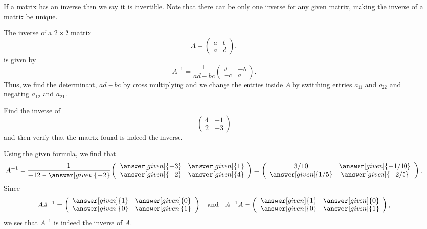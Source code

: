 \documentclass{ximera}
\begin{document}
If a matrix has an inverse then we say it is invertible. Note that
there can be only one inverse for any given matrix, making the inverse
of a matrix be unique.

The inverse of a $2\times 2$ matrix
\[
  A =
  \left(\begin{array}{cc}
    a & b  \\
    a &  d
  \end{array}\right),
\]
is given by
\[
A^{-1}=  \frac{1}{ad-bc} \left(\begin{array}{cc}
  d & -b  \\
  -c &  a
\end{array}\right).
\]
Thus, we find the determinant, $ad-bc$ by cross multiplying and we change the entries inside $A$ by switching entries $a_{11}$ and $a_{22}$ and negating $a_{12}$ and $a_{21}$.

\begin{question}
  Find the inverse of
  \[
    \left(
      \begin{array}{cc}
        4 & -1 \\
        2 & -3
      \end{array}
    \right)
  \]
  and then verify that the matrix found is indeed the inverse.
  \begin{prompt}
    Using the given formula, we find that
    \[
      A^{-1}=  \frac{1}{-12-\answer[given]{-2}}
      \left(
        \begin{array}{cc}
          \answer[given]{-3} &  \answer[given]{1} \\
          \answer[given]{-2} &  \answer[given]{4}
        \end{array}
      \right)
      = \left(
        \begin{array}{cc}
          3/10 &  \answer[given]{-1/10} \\
          \answer[given]{1/5} &  \answer[given]{-2/5}
        \end{array}
      \right).
    \]
    Since
    \[
      AA^{-1}= \left(
        \begin{array}{cc}
          \answer[given]{1} &  \answer[given]{0} \\
          \answer[given]{0} &  \answer[given]{1}
        \end{array}
      \right)
      \quad\text{and}\quad
      A^{-1}A= \left(
        \begin{array}{cc}
          \answer[given]{1} &  \answer[given]{0} \\
          \answer[given]{0} &  \answer[given]{1}
        \end{array}
      \right),
    \]
    we see that $A^{-1}$ is indeed the inverse of $A$.
  \end{prompt}
\end{question}
\end{document}
